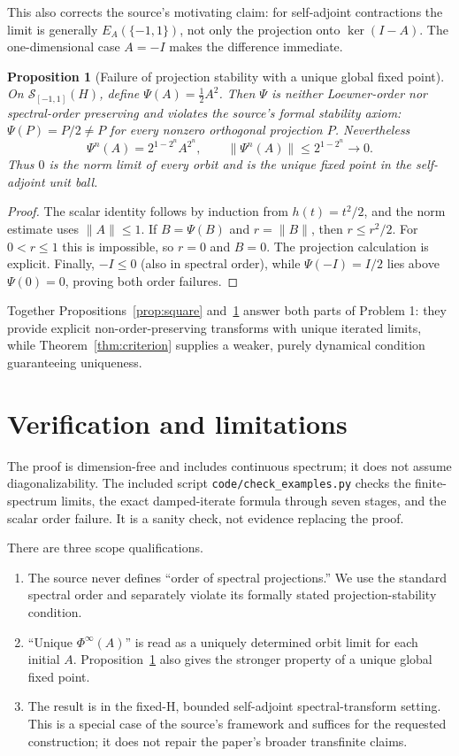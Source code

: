 \documentclass[11pt]{article}
\newtheorem{proposition}{Proposition}
\newcommand{\1}{\mathbf 1}
\begin{document}
This also corrects the source's motivating claim: for self-adjoint
contractions the limit is generally \(E_A(\{-1,1\})\), not only the
projection onto \(\ker(I-A)\).  The one-dimensional case \(A=-I\) makes the
difference immediate.

\begin{proposition}[Failure of projection stability with a unique global
fixed point]\label{prop:damped}
On \(\mathcal S_{[-1,1]}(H)\), define
\(\Psi(A)=\tfrac12A^2\).  Then \(\Psi\) is neither Loewner-order nor
spectral-order preserving and violates the source's formal stability axiom:
\(\Psi(P)=P/2\ne P\) for every nonzero orthogonal projection \(P\).
Nevertheless
\[
 \Psi^n(A)=2^{1-2^n}A^{2^n},
 \qquad
 \|\Psi^n(A)\|\le 2^{1-2^n}\longrightarrow0.
\]
Thus \(0\) is the norm limit of every orbit and is the unique fixed point in
the self-adjoint unit ball.
\end{proposition}

\begin{proof}
The scalar identity follows by induction from \(h(t)=t^2/2\), and the norm
estimate uses \(\|A\|\le1\).  If \(B=\Psi(B)\) and \(r=\|B\|\), then
\(r\le r^2/2\).  For \(0<r\le1\) this is impossible, so \(r=0\) and \(B=0\).
The projection calculation is explicit.  Finally, \(-I\le0\) (also in
spectral order), while \(\Psi(-I)=I/2\) lies above \(\Psi(0)=0\), proving
both order failures.
\end{proof}

Together Propositions~\ref{prop:square} and~\ref{prop:damped} answer both
parts of Problem 1: they provide explicit non-order-preserving transforms
with unique iterated limits, while Theorem~\ref{thm:criterion} supplies a
weaker, purely dynamical condition guaranteeing uniqueness.

\section{Verification and limitations}

The proof is dimension-free and includes continuous spectrum; it does not
assume diagonalizability.  The included script
\texttt{code/check\_examples.py} checks the finite-spectrum limits, the exact
damped-iterate formula through seven stages, and the scalar order failure.
It is a sanity check, not evidence replacing the proof.

There are three scope qualifications.
\begin{enumerate}[leftmargin=*]
\item The source never defines ``order of spectral projections.''  We use the
standard spectral order and separately violate its formally stated
projection-stability condition.
\item ``Unique \(\Phi^\infty(A)\)'' is read as a uniquely determined orbit
limit for each initial \(A\).  Proposition~\ref{prop:damped} also gives the
stronger property of a unique global fixed point.
\item The result is in the fixed-H, bounded self-adjoint spectral-transform
setting.  This is a special case of the source's framework and suffices for
the requested construction; it does not repair the paper's broader
transfinite claims.
\end{enumerate}
\end{document}
